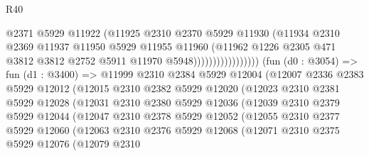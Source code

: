 \begin{lexlean}{R40}
\begin{coremodule}
                                    @2371
                                    @5929
                                    @11922
                                    (@11925
                                      @2310
                                      @2370
                                      @5929
                                      @11930
                                      (@11934
                                        @2310
                                        @2369
                                        @11937
                                        @11950
                                        @5929
                                        @11955
                                        @11960
                                        (@11962
                                          @1226
                                          @2305
                                          @471
                                          @3812
                                          @3812
                                          @2752
                                          @5911
                                          @11970
                                          @5948)))))))))))))))))
        (fun (d0 : @3054) =>
        fun (d1 : @3400) =>
        @11999
          @2310
          @2384
          @5929
          @12004
          (@12007
            @2336
            @2383
            @5929
            @12012
            (@12015
              @2310
              @2382
              @5929
              @12020
              (@12023
                @2310
                @2381
                @5929
                @12028
                (@12031
                  @2310
                  @2380
                  @5929
                  @12036
                  (@12039
                    @2310
                    @2379
                    @5929
                    @12044
                    (@12047
                      @2310
                      @2378
                      @5929
                      @12052
                      (@12055
                        @2310
                        @2377
                        @5929
                        @12060
                        (@12063
                          @2310
                          @2376
                          @5929
                          @12068
                          (@12071
                            @2310
                            @2375
                            @5929
                            @12076
                            (@12079
                              @2310

\end{coremodule}
\end{lexlean}
